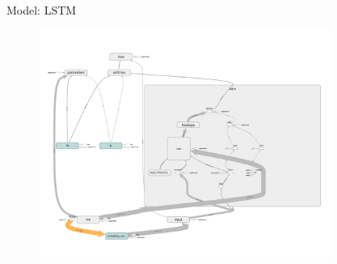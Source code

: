 \documentclass[final]{beamer}
\newlength{\sepwid}
\newlength{\onecolwid}
\newlength{\twocolwid}
\begin{document}
\begin{frame}[t]
\begin{columns}[t]
\begin{column}{\twocolwid}
\begin{columns}[t,totalwidth=\twocolwid]
\begin{column}{\onecolwid}

\end{column} %

\begin{column}{\onecolwid} %


\begin{block}{Model: LSTM}

\begin{figure}
\includegraphics[width=\linewidth]{figure/lstm_architecture}
\end{figure}

\end{block}


\end{column} %

\end{columns} %

\end{column} %

\begin{column}{\sepwid}\end{column} %

\begin{column}{\onecolwid} %


\end{column}
\end{columns}
\end{frame}
\end{document}
